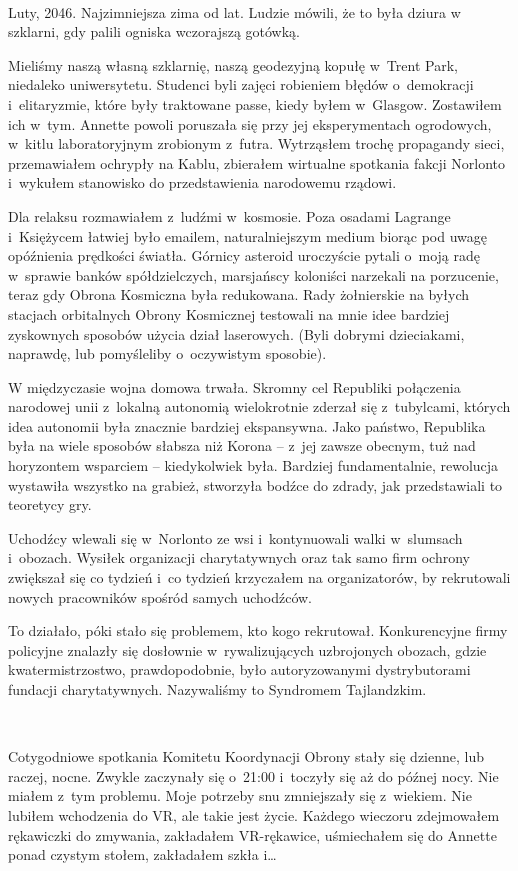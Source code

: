 \documentclass[oneside,polish,11pt,sfheadings]{mwbk}
\begin{document}
~

Luty, 2046. Najzimniejsza zima od lat. Ludzie mówili, że to była dziura
w szklarni, gdy palili ogniska wczorajszą gotówką.

Mieliśmy naszą własną szklarnię, naszą geodezyjną kopułę w~Trent Park,
niedaleko uniwersytetu. Studenci byli zajęci robieniem błędów o~demokracji i~elitaryzmie, które były traktowane passe, kiedy byłem w~Glasgow. Zostawiłem ich w~tym. Annette powoli poruszała się przy jej
eksperymentach ogrodowych, w~kitlu laboratoryjnym zrobionym z~futra.
Wytrząsłem trochę propagandy sieci, przemawiałem ochrypły na Kablu,
zbierałem wirtualne spotkania fakcji Norlonto i~wykułem stanowisko do
przedstawienia narodowemu rządowi.

Dla relaksu rozmawiałem z~ludźmi w~kosmosie. Poza osadami Lagrange i~Księżycem łatwiej było emailem, naturalniejszym medium biorąc pod uwagę
opóźnienia prędkości światła. Górnicy asteroid uroczyście pytali o~moją radę w~sprawie banków spółdzielczych, marsjańscy koloniści
narzekali na porzucenie, teraz gdy Obrona Kosmiczna była redukowana.
Rady żołnierskie na byłych stacjach orbitalnych Obrony Kosmicznej
testowali na mnie idee bardziej zyskownych sposobów użycia dział
laserowych. (Byli dobrymi dzieciakami, naprawdę, lub pomyśleliby o~oczywistym sposobie).

W międzyczasie wojna domowa trwała. Skromny cel Republiki połączenia
narodowej unii z~lokalną autonomią wielokrotnie zderzał się z~tubylcami,
których idea autonomii była znacznie bardziej ekspansywna. Jako państwo,
Republika była na wiele sposobów słabsza niż Korona -- z~jej zawsze
obecnym, tuż nad horyzontem wsparciem -- kiedykolwiek była. Bardziej
fundamentalnie, rewolucja wystawiła wszystko na grabież, stworzyła
bodźce do zdrady, jak przedstawiali to teoretycy gry.

Uchodźcy wlewali się w~Norlonto ze wsi i~kontynuowali walki w~slumsach i~obozach. Wysiłek organizacji charytatywnych oraz tak samo firm ochrony
zwiększał się co tydzień i~co tydzień krzyczałem na organizatorów, by
rekrutowali nowych pracowników spośród samych uchodźców.

To działało, póki stało się problemem, kto kogo rekrutował.
Konkurencyjne firmy policyjne znalazły się dosłownie w~rywalizujących
uzbrojonych obozach, gdzie kwatermistrzostwo, prawdopodobnie, było
autoryzowanymi dystrybutorami fundacji charytatywnych. Nazywaliśmy to
Syndromem Tajlandzkim.

~

Cotygodniowe spotkania Komitetu Koordynacji Obrony stały się dzienne,
lub raczej, nocne. Zwykle zaczynały się o~21:00 i~toczyły się aż do
późnej nocy. Nie miałem z~tym problemu. Moje potrzeby snu zmniejszały
się z~wiekiem. Nie lubiłem wchodzenia do VR, ale takie jest życie.
Każdego wieczoru zdejmowałem rękawiczki do zmywania, zakładałem
VR-rękawice, uśmiechałem się do Annette ponad czystym stołem, zakładałem
szkła i\ldots
\end{document}

